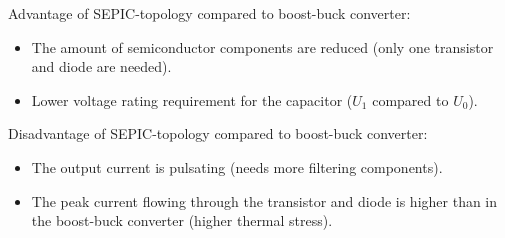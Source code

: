
\begin{solutionblock}
	Advantage of SEPIC-topology compared to boost-buck converter:
	\begin{itemize}
		\item The amount of semiconductor components are reduced (only one transistor and diode are needed).
		\item Lower voltage rating requirement for the capacitor ($U_1$ compared to $U_0$).
	\end{itemize}
	Disadvantage of SEPIC-topology compared to boost-buck converter:
	\begin{itemize}
		\item The output current is pulsating (needs more filtering components).
		\item The peak current flowing through the transistor and diode is higher than in the boost-buck converter (higher thermal stress).
	\end{itemize}
\end{solutionblock}
